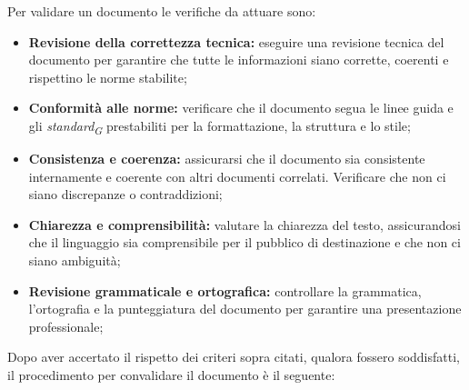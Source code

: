 Per validare un documento le verifiche da attuare sono:
\begin{itemize}
    \item \textbf{Revisione della correttezza tecnica:} 
        eseguire una revisione tecnica del documento per garantire che tutte le informazioni siano corrette, coerenti e rispettino le norme stabilite; 
    \item \textbf{Conformità alle norme:} 
        verificare che il documento segua le linee guida e gli \textit{standard}\textsubscript{\textit{G}} prestabiliti per la formattazione, la struttura e lo stile; 
    \item \textbf{Consistenza e coerenza:} 
        assicurarsi che il documento sia consistente internamente e coerente con altri documenti correlati. Verificare che non ci siano discrepanze o contraddizioni;
    \item \textbf{Chiarezza e comprensibilità:} 
        valutare la chiarezza del testo, assicurandosi che il linguaggio sia comprensibile per il pubblico di destinazione e che non ci siano ambiguità;
    \item \textbf{Revisione grammaticale e ortografica:} 
        controllare la grammatica, l'ortografia e la punteggiatura del documento per garantire una presentazione professionale;
\end{itemize}

Dopo aver accertato il rispetto dei criteri sopra citati, qualora fossero soddisfatti, il procedimento per convalidare il documento è il seguente:

